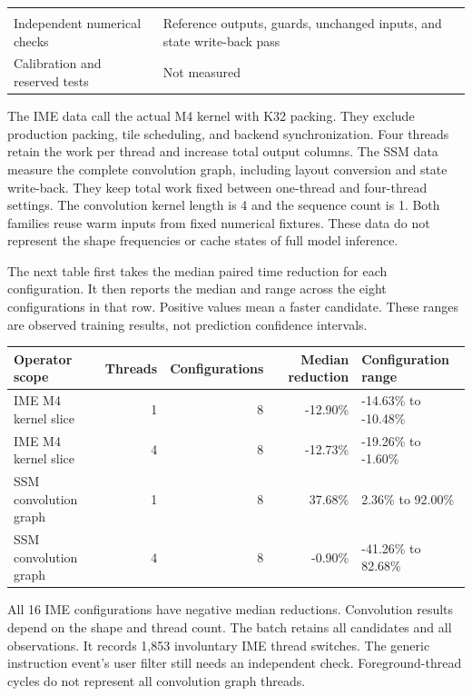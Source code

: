 \documentclass[10pt,a4paper]{article}
\begin{document}
\begin{longtable}[]{@{}ll@{}}
\begin{minipage}[t]{0.47\columnwidth}
\end{minipage}\tabularnewline
\begin{minipage}[t]{0.47\columnwidth}\raggedright
Independent numerical checks\strut
\end{minipage} & \begin{minipage}[t]{0.47\columnwidth}\raggedright
Reference outputs, guards, unchanged inputs, and state write-back
pass\strut
\end{minipage}\tabularnewline
\begin{minipage}[t]{0.47\columnwidth}\raggedright
Calibration and reserved tests\strut
\end{minipage} & \begin{minipage}[t]{0.47\columnwidth}\raggedright
Not measured\strut
\end{minipage}\tabularnewline
\bottomrule
\end{longtable}

The IME data call the actual M4 kernel with K32 packing. They exclude
production packing, tile scheduling, and backend synchronization. Four
threads retain the work per thread and increase total output columns.
The SSM data measure the complete convolution graph, including layout
conversion and state write-back. They keep total work fixed between
one-thread and four-thread settings. The convolution kernel length is 4
and the sequence count is 1. Both families reuse warm inputs from fixed
numerical fixtures. These data do not represent the shape frequencies or
cache states of full model inference.

The next table first takes the median paired time reduction for each
configuration. It then reports the median and range across the eight
configurations in that row. Positive values mean a faster candidate.
These ranges are observed training results, not prediction confidence
intervals.

\begin{longtable}[]{@{}lrrrl@{}}
\toprule
Operator scope & Threads & Configurations & Median reduction &
Configuration range\tabularnewline
\midrule
\endhead
IME M4 kernel slice & 1 & 8 & -12.90\% & -14.63\% to
-10.48\%\tabularnewline
IME M4 kernel slice & 4 & 8 & -12.73\% & -19.26\% to
-1.60\%\tabularnewline
SSM convolution graph & 1 & 8 & 37.68\% & 2.36\% to
92.00\%\tabularnewline
SSM convolution graph & 4 & 8 & -0.90\% & -41.26\% to
82.68\%\tabularnewline
\bottomrule
\end{longtable}

All 16 IME configurations have negative median reductions. Convolution
results depend on the shape and thread count. The batch retains all
candidates and all observations. It records 1,853 involuntary IME thread
switches. The generic instruction event's user filter still needs an
independent check. Foreground-thread cycles do not represent all
convolution graph threads.
\end{document}
